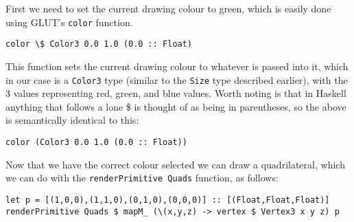 \documentclass[12pt, a4paper]{report}
\begin{document}
First we need to set the current drawing colour to green, which is easily done using GLUT's \verb|color| function.

\begin{lstlisting}
color \$ Color3 0.0 1.0 (0.0 :: Float)
\end{lstlisting}

This function sets the current drawing colour to whatever is passed into it, which in our case is a \verb|Color3| type (similar to the \verb|Size| type described earlier), with the 3 values representing red, green, and blue values.
Worth noting is that in Haskell anything that follows a lone \$ is thought of as being in parentheses, so the above is semantically identical to this:

\begin{lstlisting}
color (Color3 0.0 1.0 (0.0 :: Float))
\end{lstlisting}

Now that we have the correct colour selected we can draw a quadrilateral, which we can do with the \verb|renderPrimitive Quads| function, as follows:

\begin{lstlisting}[xleftmargin=-0.1\textwidth, xrightmargin=-0.1\textwidth]
let p = [(1,0,0),(1,1,0),(0,1,0),(0,0,0)] :: [(Float,Float,Float)]
renderPrimitive Quads $ mapM_ (\(x,y,z) -> vertex $ Vertex3 x y z) p
\end{lstlisting}
\end{document}
